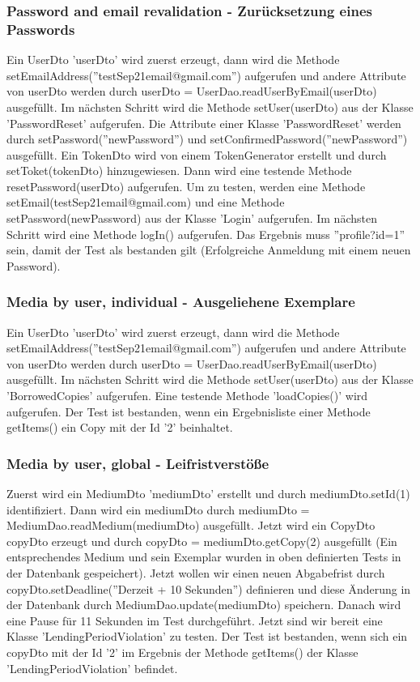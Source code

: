\documentclass{article}
\begin{document}
\subsubsection{Password and email revalidation - Zurücksetzung eines Passwords}
Ein UserDto 'userDto' wird zuerst erzeugt, dann wird die Methode \linebreak setEmailAddress(''testSep21email@gmail.com'') aufgerufen und andere Attribute von userDto werden durch userDto = UserDao.readUserByEmail(userDto) ausgefüllt. Im nächsten Schritt wird die Methode setUser(userDto) aus der Klasse 'PasswordReset' aufgerufen.
Die Attribute einer Klasse 'PasswordReset' werden durch setPassword(''newPassword'') und \linebreak setConfirmedPassword(''newPassword'') ausgefüllt. Ein TokenDto wird von einem TokenGenerator erstellt und durch setToket(tokenDto) hinzugewiesen. Dann wird eine testende Methode resetPassword(userDto) aufgerufen. Um zu testen, werden eine Methode setEmail(testSep21email@gmail.com) und eine Methode setPassword(newPassword) aus der Klasse 'Login' aufgerufen. Im nächsten Schritt wird eine Methode logIn() aufgerufen. Das Ergebnis muss ''profile?id=1'' sein, damit der Test als bestanden gilt (Erfolgreiche Anmeldung mit einem neuen Password).

\subsubsection{Media by user, individual - Ausgeliehene Exemplare}
Ein UserDto 'userDto' wird zuerst erzeugt, dann wird die Methode \linebreak setEmailAddress(''testSep21email@gmail.com'') aufgerufen und andere Attribute von userDto werden durch userDto = UserDao.readUserByEmail(userDto) ausgefüllt. Im nächsten Schritt wird die Methode setUser(userDto) aus der Klasse 'BorrowedCopies' aufgerufen. Eine testende Methode 'loadCopies()' wird aufgerufen. Der Test ist bestanden, wenn ein Ergebnisliste einer Methode getItems() ein Copy mit der Id '2' beinhaltet.

\subsubsection{Media by user, global - Leifristverstöße}
Zuerst wird ein MediumDto 'mediumDto' erstellt und durch mediumDto.setId(1) identifiziert. Dann wird ein mediumDto durch mediumDto = MediumDao.readMedium(mediumDto) ausgefüllt. Jetzt wird ein CopyDto copyDto erzeugt und durch copyDto = mediumDto.getCopy(2) ausgefüllt (Ein entsprechendes Medium und sein Exemplar wurden in oben definierten Tests in der Datenbank gespeichert). Jetzt wollen wir einen neuen Abgabefrist durch copyDto.setDeadline(''Derzeit + 10 Sekunden'') definieren und diese Änderung in der Datenbank durch MediumDao.update(mediumDto) speichern. Danach wird eine Pause für 11 Sekunden im Test durchgeführt. Jetzt sind wir bereit eine Klasse 'LendingPeriodViolation' zu testen. Der Test ist bestanden, wenn sich ein copyDto mit der Id '2' im Ergebnis der Methode getItems() der Klasse 'LendingPeriodViolation' befindet.
\end{document}
